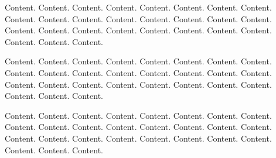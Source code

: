 
Content. Content. Content. Content. Content. Content. Content. Content. Content. Content. Content. Content. Content. Content. Content. Content. Content. Content. Content. Content. Content. Content. Content. Content. Content. Content. Content. 

\medskip

Content. Content. Content. Content. Content. Content. Content. Content. Content. Content. Content. Content. Content. Content. Content. Content. Content. Content. Content. Content. Content. Content. Content. Content. Content. Content. Content. 

\medskip

Content. Content. Content. Content. Content. Content. Content. Content. Content. Content. Content. Content. Content. Content. Content. Content. Content. Content. Content. Content. Content. Content. Content. Content. Content. Content. Content. 

